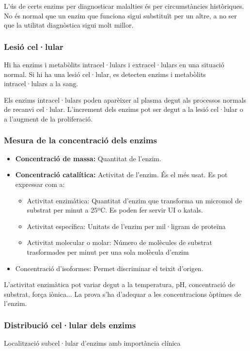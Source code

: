 L'ús de certs enzims per diagnosticar malalties és per circumstàncies
històriques. No és normal que un enzim que funciona sigui substituït
per un altre, a no ser que la utilitat diagnòstica sigui molt millor.

\subsubsection{Lesió cel·lular}
Hi ha enzims i metabòlits intracel·lulars i extracel·lulars en una
situació normal. Si hi ha una lesió cel·lular, es detecten enzims i
metabòlits intracel·lulars a la sang.

Els enzims intracel·lulars poden aparèixer al plasma degut als
processos normals de recanvi cel·lular. L'increment dels enzims pot
ser degut a la lesió cel·lular o a l'augment de la proliferació.

\subsubsection{Mesura de la concentració dels enzims}
\begin{itemize}
\item \textbf{Concentració de massa:} Quantitat de l'enzim.
\item \textbf{Concentració catalítica:} Activitat de l'enzim. És el
  més usat. Es pot expressar com a:
  \begin{itemize}
  \item Activitat enzimàtica: Quantitat d'enzim que transforma un
    micromol de substrat per minut a 25ºC. Es poden fer servir UI o katals.
  \item Activitat específica: Unitats de l'enzim per mil·ligram de proteïna
  \item Activitat molecular o molar: Número de molècules de substrat
    trasformades per minut per
una sola molècula d'enzim
  \end{itemize}
\item Concentració d'isoformes: Permet discriminar el teixit d'origen.
\end{itemize}

L'activitat enzimàtica pot variar degut a la temperatura, pH,
concentració de substrat, força iònica... La prova s'ha d'adequar a
les concentracions òptimes de l'enzim.

\subsubsection{Distribució cel·lular dels enzims}
\begin{table}[H]
  \centering
  
  \caption{Localització subcel·lular d'enzims amb importància clínica}
  \label{tab:enzims}
\end{table}

